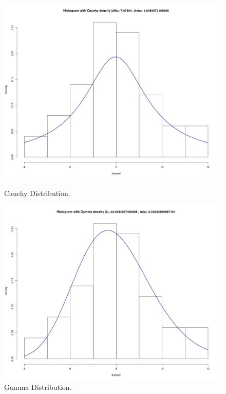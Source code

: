 \documentclass[12pt]{article}
\begin{document}
\begin{figure}[h] 
	\begin{minipage}[b]{0.5\linewidth}
		\centering
		\includegraphics[width=\linewidth]{images/Histogram_Cauchy.png} 
		\caption{Cauchy Distribution.}
		\vspace{4ex}
		\label{histogram_cauchy}
	\end{minipage}%
	\begin{minipage}[b]{0.5\linewidth}
		\centering
		\includegraphics[width=\linewidth]{images/Histogram_Gamma.png} 
		\caption{Gamma Distribution.}
		\vspace{4ex}

\end{minipage}
\end{figure}
\end{document}
